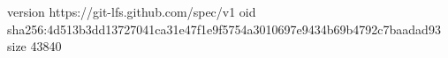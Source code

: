 version https://git-lfs.github.com/spec/v1
oid sha256:4d513b3dd13727041ca31e47f1e9f5754a3010697e9434b69b4792c7baadad93
size 43840
